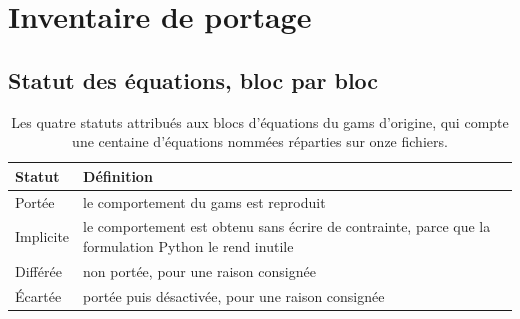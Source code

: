 ﻿\chapter{Inventaire de portage }
\label{ann:portage}

\section{Statut des équations, bloc par bloc}

\begin{table}[H]
  \centering
  \caption{Les quatre statuts attribués aux blocs d'équations du \gls{gams} d'origine, qui
  compte une centaine d'équations nommées réparties sur onze fichiers.}
  \label{tab:ann-statuts}
  \scriptsize
  \setlength{\tabcolsep}{4pt}
  \begin{tabularx}{\textwidth}{@{}p{22mm}X@{}}
    \toprule
    \textbf{Statut} & \textbf{Définition} \\
    \midrule
    Portée & le comportement du \gls{gams} est reproduit \\
    Implicite & le comportement est obtenu sans écrire de contrainte, parce que la formulation
      Python le rend inutile \\
    Différée & non portée, pour une raison consignée \\
    Écartée & portée puis désactivée, pour une raison consignée \\
    \bottomrule
  \end{tabularx}
\end{table}

